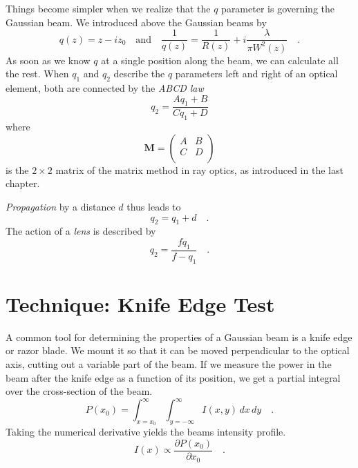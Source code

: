 Things become simpler when we realize that the $q$ parameter is governing the Gaussian beam. We introduced above the Gaussian beams by 
\begin{equation}
    q(z) = z - i z_0 \quad \text{and} \quad
    \frac{1}{q(z)} = \frac{1}{R(z)} + i \frac{\lambda}{\pi W^2(z)} \quad .
\end{equation} 
As soon as we know $q$ at a single position along the beam, we can calculate all the rest. When $q_1$  and $q_2$ describe the $q$ parameters left and right of an optical element, both are connected by the \emph{ABCD law}
\begin{equation}
    q_2 = \frac{A q_1 + B}{C q_1 + D}
\end{equation}
where 
\begin{equation}
\boldsymbol{M} = 
\begin{pmatrix}
    A & B \\ C & D \\
\end{pmatrix}
\end{equation}
is the $2\times2$ matrix of the matrix method in ray optics, as introduced in the last chapter.

\emph{Propagation} by a distance $d$ thus leads to 
\begin{equation}
    q_2 = q_1 + d \quad .
\end{equation}
The action of a \emph{lens} is described by
\begin{equation}
    q_2 = \frac{f q_1}{f - q_1} \quad .
\end{equation}




\section{Technique: Knife Edge Test}


A common tool for determining the properties of a Gaussian beam is a knife edge or razor blade. We mount it so that it can be moved perpendicular to the optical axis, cutting out a variable part of the beam. If we measure the power in the beam after the knife edge as a function of its position, we get a partial integral over the cross-section of the beam.
\begin{equation}
    P(x_0) = \int_{x=x_0}^\infty \int_{y=-\infty}^\infty I(x,y) \, dx \, dy \quad .
\end{equation}
Taking the numerical derivative yields the beams intensity profile.
\begin{equation}
    I(x) \propto \frac{\partial P(x_0)}{\partial x_0} \quad .
\end{equation}


